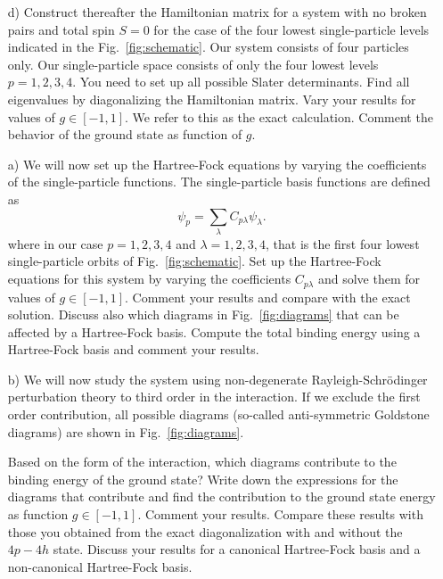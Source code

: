 \begin{prob}
\begin{enumerate}
\item[d)]
Construct thereafter the Hamiltonian matrix for a system with no
  broken pairs and total spin $S=0$ for the case of the four lowest
  single-particle levels indicated in the
  Fig.~\ref{fig:schematic}. Our system consists of four particles
  only.  Our single-particle space consists of only the four lowest
  levels $p=1,2,3,4$.  You need to set up all possible Slater
  determinants.  Find all eigenvalues by diagonalizing the Hamiltonian
  matrix.  Vary your results for values of $g\in [-1,1]$.  We refer to
  this as the exact calculation. Comment the behavior of the ground
  state as function of $g$.
\end{enumerate}
\end{prob}



\begin{prob}\label{problem:prob8.5}
\begin{enumerate}
\item[a)]
We will now set up the Hartree-Fock equations by varying the
coefficients of the single-particle functions. The single-particle
basis functions are defined as
\[
\psi_p = \sum_{\lambda} C_{p\lambda}\psi_{\lambda}.
\]
where in our case $p=1,2,3,4$ and $\lambda=1,2,3,4$, that is the first
four lowest single-particle orbits of Fig.~\ref{fig:schematic}.  Set
up the Hartree-Fock equations for this system by varying the
coefficients $C_{p\lambda}$ and solve them for values of $g\in
[-1,1]$.  Comment your results and compare with the exact
solution. Discuss also which diagrams in Fig.~\ref{fig:diagrams} that
can be affected by a Hartree-Fock basis. Compute the total binding
energy using a Hartree-Fock basis and comment your results.

\item[b)]
We will now study the system using non-degenerate
Rayleigh-Schr\"odinger perturbation theory to third order in the
interaction.  If we exclude the first order contribution, all possible
diagrams (so-called anti-symmetric Goldstone diagrams) are
shown in Fig.~\ref{fig:diagrams}.


Based on the form of the interaction, which diagrams contribute to the
binding energy of the ground state?  Write down the expressions for
the diagrams that contribute and find the contribution to the ground
state energy as function $g\in [-1,1]$. Comment your results.  Compare
these results with those you obtained from the exact diagonalization with and without the $4p-4h$ state.
Discuss your results for a canonical Hartree-Fock basis and a non-canonical Hartree-Fock basis.



\end{enumerate}
\end{prob}
